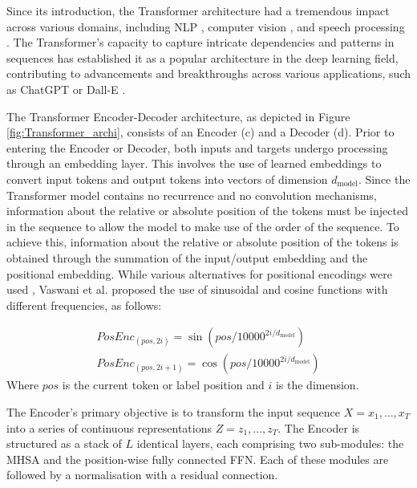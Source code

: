 Since its introduction, the Transformer architecture had a tremendous impact across various domains, including \ac{NLP} \cite{Bert,brown2020language}, computer vision \cite{dosovitskiy2020image}, and speech processing \cite{dong2018speech}. The Transformer's capacity to capture intricate dependencies and patterns in sequences has established it as a popular architecture in the deep learning field, contributing to advancements and breakthroughs across various applications, such as ChatGPT \cite{bahrini2023chatgpt} or Dall-E \cite{ramesh2021zero}.

The Transformer Encoder-Decoder architecture, as depicted in Figure \ref{fig:Transformer_archi}, consists of an Encoder (c) and a Decoder (d). Prior to entering the Encoder or Decoder, both inputs and targets undergo processing through an embedding layer. This involves the use of learned embeddings to convert input tokens and output tokens into vectors of dimension $d_{\text{model}}$. 
Since the Transformer model contains no recurrence and no convolution mechanisms, information about the relative or absolute position of the tokens must be injected in the sequence to allow the model to make use of the order of the sequence. To achieve this, information about the relative or absolute position of the tokens is obtained through the summation of the input/output embedding and the positional embedding. While various alternatives for positional encodings were used , Vaswani et al. \cite{vaswani2017attention} proposed the use of sinusoidal and cosine functions with different frequencies, as follows:

\begin{align}
    PosEnc_{(pos,2i)} = \sin(pos/10000^{2i/d_{\text{model}}})\\
    PosEnc_{(pos,2i+1)} = \cos(pos/10000^{2i/d_{\text{model}}})
\end{align}
Where $pos$ is the current token or label position and $i$ is the dimension.
 

The Encoder's primary objective is to transform the input sequence $X = x_1, \dots, x_T$ into a series of continuous representations $Z = z_1, \dots, z_T$. The Encoder is structured as a stack of $L$ identical layers, each comprising two sub-modules: the \ac{MHSA} and the position-wise fully connected \ac{FFN}. Each of these modules are followed by a normalisation with a residual connection.

